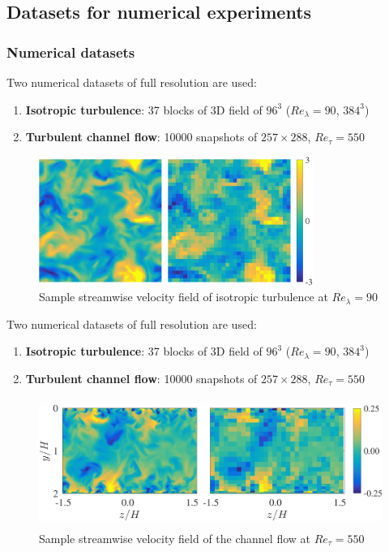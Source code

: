 \documentclass{beamer}
\let\olditem\item
\renewcommand{\item}{\setlength{\itemsep}{\fill}\olditem}
\begin{document}
\subsection[Datasets]{Datasets for numerical experiments}
\begin{frame}
\frametitle{Numerical datasets}
	\begin{overprint}
		Two numerical datasets of full resolution are used:
		\begin{enumerate}[(i. )]
			\item \textbf{\color{red} Isotropic turbulence}: 37 blocks of 3D field of $ 96^3 $ ($ Re_\lambda = 90$, $ 384^3 $) \\
			\item {\color{black!20} \textbf{\color{red!20} Turbulent channel flow}: 10000 snapshots of $ 257 \times 288 $, $ Re_\tau = 550 $}
		\end{enumerate}
		\begin{figure}
			\centering
			\includegraphics[height=4.2cm]{./figures/turbulence/isotropic/u_HR_2D.png}
			\caption*{Sample streamwise velocity field of isotropic turbulence at $ Re_\lambda = 90$}
		\end{figure}		
	
		Two numerical datasets of full resolution are used:
		\begin{enumerate}[(i. )]
			\item {\color{black!20} \textbf{\color{red!20} Isotropic turbulence}: 37 blocks of 3D field of $ 96^3 $ ($ Re_\lambda = 90$, $ 384^3 $)} \\
			\item \textbf{\color{red} Turbulent channel flow}: 10000 snapshots of $ 257 \times 288 $, $ Re_\tau = 550 $
		\end{enumerate}
		\begin{figure}
			\centering
			\includegraphics[height=4.2cm]{./figures/turbulence/channel/samplesnap_2D.png}
			\caption*{Sample streamwise velocity field of the channel flow at $ Re_\tau = 550$}
		\end{figure}		
	\end{overprint}
\end{frame}
\end{document}
